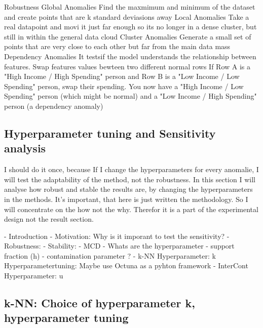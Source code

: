 Robustness 
    Global Anomalies 
    Find the maxmimum and minimum of the dataset and create points that are k standard deviasions away
Local Anomalies
    Take a real datapoint and movi it just far enough so its no longer in a dense cluster, but still in within the general data cloud
Cluster Anomalies
    Generate a small set of points that are very close to each other but far from the main data mass
Dependency Anomalies
    It testsif the model understands the relationship between features. Swap features values bewteen two different normal rows
    If Row A is a "High Income / High Spending" person and Row B is a "Low Income / Low Spending" person, swap their spending. 
    You now have a "High Income / Low Spending" person (which might be normal) and a "Low Income / High Spending" person (a dependency anomaly)

\subsection{Hyperparameter tuning and Sensitivity analysis}
I should do it once, because If I change the hyperparameters for every anomalie, I will test the adaptability of the method, not the robustness.
In this section I will analyse how robust and stable the results are, by changing the hyperparameters in the methods.
It's important, that here is just written the methodology. 
So I will concentrate on the how not the why. 
Therefor it is a part of the experimental design not the result section.

- Introduction 
    - Motivation: Why is it imporant to test the sensitivity?
    - Robustness: 
    - Stability: 
- MCD
    - Whats are the hyperparameter - support fraction (h)
    - contamination parameter ?
- k-NN  
    Hyperparameter: k 
    Hyperparametertuning: Maybe use Octuna as a pyhton framework
- InterCont
    Hyperparameter: u 

\subsection{k-NN: Choice of hyperparameter k, hyperparameter tuning}
